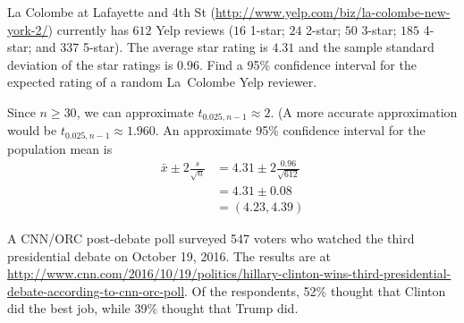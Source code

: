 \documentclass[answers,11pt]{exam}
\begin{document}
\begin{questions}
\begin{parts}

\end{parts}


\question La Colombe at Lafayette and 4th St
(\url{http://www.yelp.com/biz/la-colombe-new-york-2/}) currently has $612$ Yelp
reviews ($16$ 1-star; $24$ 2-star; $50$ 3-star; $185$ 4-star; and $337$
5-star).  The average star rating is $4.31$ and the sample standard deviation
of the star ratings is $0.96$.  Find a 95\% confidence interval for the
expected rating of a random La~Colombe Yelp reviewer.

\begin{solution}
Since $n \geq 30$, we can approximate $t_{0.025,n-1} \approx 2$.  (A more
accurate approximation would be $t_{0.025,n-1} \approx 1.960$.  An approximate
95\% confidence interval for the population mean is
\begin{align*}
  \bar x \pm 2 \frac{s}{\sqrt{n}}
    &= 4.31 \pm 2 \frac{0.96}{\sqrt{612}} \\
    &= 4.31 \pm 0.08 \\
    &= (4.23, 4.39)
\end{align*}
\end{solution}



\newpage
{}

\question A CNN/ORC post-debate poll surveyed 547 voters who watched the third
presidential debate on October 19, 2016. The results are at
\url{http://www.cnn.com/2016/10/19/politics/hillary-clinton-wins-third-presidential-debate-according-to-cnn-orc-poll}.
Of the respondents, 52\% thought that Clinton did the best job, while 39\%
thought that Trump did.

\end{questions}
\end{document}

